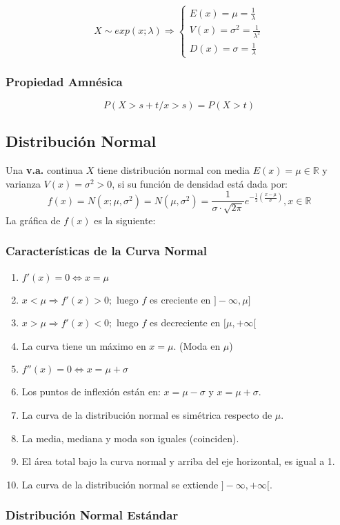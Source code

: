 $$
X\sim exp(x;\lambda)\Rightarrow
\begin{cases}
E(x) = \mu = \frac{1}{\lambda} \\
V(x) = \sigma^2 = \frac{1}{\lambda^2} \\
D(x) = \sigma = \frac{1}{\lambda}
\end{cases}
$$
\subsubsection{Propiedad Amnésica}
$$P(X>s+t / x> s)=P(X>t)$$

\subsection{Distribución Normal}
Una \textbf{v.a.} continua $X$ tiene distribución normal con media $E(x)=\mu \in \mathbb{R}$ y varianza $V(x)=\sigma^2 >0$, si su función de densidad está dada por:
$$
f(x) = N(x;\mu,\sigma^2)=N(\mu,\sigma^2)=\dfrac{1}{\sigma \cdot \sqrt{2\pi}}e^{-\frac{1}{2}(\frac{x-\mu}{\sigma})}, x\in \mathbb{R}
$$
La gráfica de $f(x)$ es la siguiente:
\subsubsection{Características de la Curva Normal}
\begin{enumerate}
\item $f'(x)=0\Leftrightarrow x=\mu$
\item $x<\mu \Rightarrow f'(x)>0;$ luego $f$ es creciente en $]-\infty,\mu]$
\item $x>\mu \Rightarrow f'(x)<0;$ luego $f$ es decreciente en $[\mu,+\infty[$
\item La curva tiene un máximo en $x=\mu$. (Moda en $\mu$)
\item $f''(x)=0 \Leftrightarrow x = \mu + \sigma$
\item Los puntos de inflexión están en: $x=\mu-\sigma$ y $x=\mu+\sigma$.
\item La curva de la distribución normal es simétrica respecto de $\mu$.
\item La media, mediana y moda son iguales (coinciden).
\item El área total bajo la curva normal y arriba del eje horizontal, es igual a 1.
\item La curva de la distribución normal se extiende $]-\infty,+\infty[$.
\end{enumerate}
\subsubsection{Distribución Normal Estándar}
